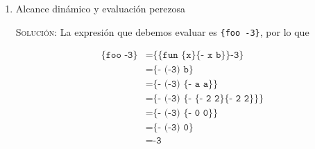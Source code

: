 \documentclass[letterpaper,11pt]{article}
\begin{document}
\begin{enumerate}
\begin{enumerate}
        \newpage
        \item Alcance dinámico y evaluación perezosa

        \textsc{Solución:} La expresión que debemos evaluar es 
        \texttt{\{foo -3\}}, por lo que 
        \begin{table}[h]
            \parbox{.6\linewidth}{
            \centering
            \begin{align*}
                \texttt{\{foo -3\}}
                &= \texttt{\{\{fun \{x\} \{- x b\}\} -3\}} \\
                &= \texttt{\{- (-3) b\}} \\
                &= \texttt{\{- (-3) \{- a a\}\}} \\
                &= \texttt{\{- (-3) \{- \{- 2 2\} \{- 2 2\}\}\}} \\
                &= \texttt{\{- (-3) \{- 0 0\}\}} \\
                &= \texttt{\{- (-3) 0\}} \\
                &= \texttt{-3}
            \end{align*}
            }
            \hfill
            \parbox{.4\linewidth}{
            \centering
            \begin{drawstack}[scale=1.15]
            \end{drawstack}
            }
        \end{table}
    \end{enumerate}
\end{enumerate}
\end{document}
